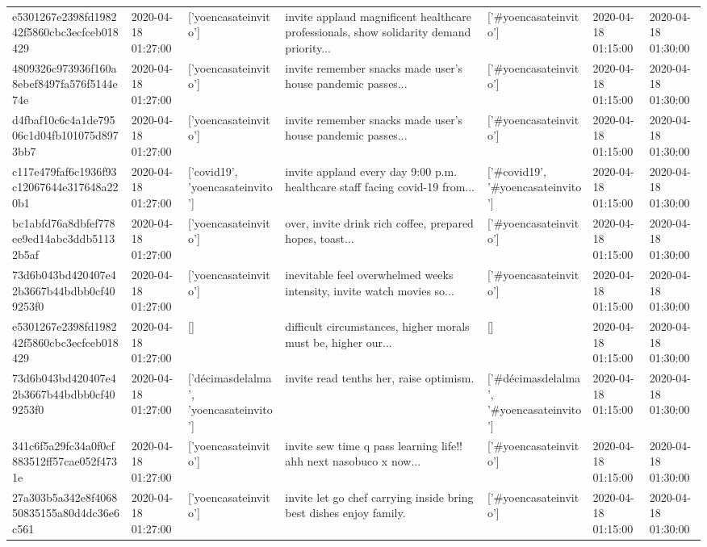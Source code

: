 \begin{tabular}{lllllll}
e5301267e2398fd198242f5860cbc3ecfceb018429 & 2020-04-18 01:27:00 & ['yoencasateinvito'] & invite applaud magnificent healthcare professionals, show solidarity demand priority... & ['#yoencasateinvito'] & 2020-04-18 01:15:00 & 2020-04-18 01:30:00 \\
4809326c973936f160a8ebef8497fa576f5144e74e & 2020-04-18 01:27:00 & ['yoencasateinvito'] & invite remember snacks made user's house pandemic passes... & ['#yoencasateinvito'] & 2020-04-18 01:15:00 & 2020-04-18 01:30:00 \\
d4fbaf10c6c4a1de79506c1d04fb101075d8973bb7 & 2020-04-18 01:27:00 & ['yoencasateinvito'] & invite remember snacks made user's house pandemic passes... & ['#yoencasateinvito'] & 2020-04-18 01:15:00 & 2020-04-18 01:30:00 \\
c117e479faf6c1936f93c12067644e317648a220b1 & 2020-04-18 01:27:00 & ['covid19', 'yoencasateinvito'] & invite applaud every day 9:00 p.m. healthcare staff facing covid-19 from... & ['#covid19', '#yoencasateinvito'] & 2020-04-18 01:15:00 & 2020-04-18 01:30:00 \\
bc1abfd76a8dbfef778ee9ed14abc3ddb51132b5af & 2020-04-18 01:27:00 & ['yoencasateinvito'] & over, invite drink rich coffee, prepared hopes, toast... & ['#yoencasateinvito'] & 2020-04-18 01:15:00 & 2020-04-18 01:30:00 \\
73d6b043bd420407e42b3667b44bdbb0cf409253f0 & 2020-04-18 01:27:00 & ['yoencasateinvito'] & inevitable feel overwhelmed weeks intensity, invite watch movies so... & ['#yoencasateinvito'] & 2020-04-18 01:15:00 & 2020-04-18 01:30:00 \\
e5301267e2398fd198242f5860cbc3ecfceb018429 & 2020-04-18 01:27:00 & [] & difficult circumstances, higher morals must be, higher our... & [] & 2020-04-18 01:15:00 & 2020-04-18 01:30:00 \\
73d6b043bd420407e42b3667b44bdbb0cf409253f0 & 2020-04-18 01:27:00 & ['décimasdelalma', 'yoencasateinvito'] & invite read tenths her, raise optimism. & ['#décimasdelalma', '#yoencasateinvito'] & 2020-04-18 01:15:00 & 2020-04-18 01:30:00 \\
341c6f5a29fc34a0f0cf883512ff57cae052f4731e & 2020-04-18 01:27:00 & ['yoencasateinvito'] & invite sew time q pass learning life!! ahh next nasobuco x now... & ['#yoencasateinvito'] & 2020-04-18 01:15:00 & 2020-04-18 01:30:00 \\
27a303b5a342e8f406850835155a80d4dc36e6c561 & 2020-04-18 01:27:00 & ['yoencasateinvito'] & invite let go chef carrying inside bring best dishes enjoy family. & ['#yoencasateinvito'] & 2020-04-18 01:15:00 & 2020-04-18 01:30:00 \\

\end{tabular}
